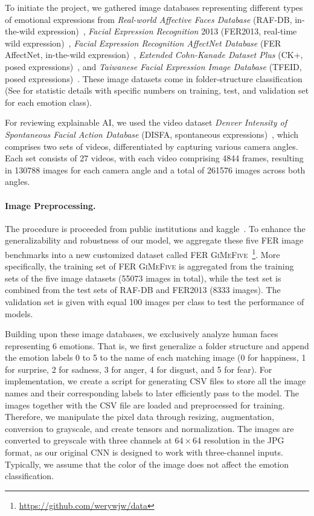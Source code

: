 To initiate the project, 
we gathered image databases representing different types of emotional expressions from 
\textit{Real-world Affective Faces Database} (RAF-DB, in-the-wild expression)~\cite{li_reliable_2017,li2019reliable}, 
\textit{Facial Expression Recognition} 2013 (FER2013, real-time wild expression)~\cite{BarsoumZCZ16}, 
\textit{Facial Expression Recognition AffectNet Database} (FER AffectNet, in-the-wild expression)~\cite{Mollah2019ANet}, 
\textit{Extended Cohn-Kanade Dataset Plus} (CK+, posed expressions)~\cite{LuceyCKSAM10}, 
and \textit{Taiwanese Facial Expression Image Database} (TFEID, posed expressions)~\cite{tfeid,LiGL22}.
These image datasets come in folder-structure classification (See  
for statistic details with specific numbers on training, test, and validation set for each emotion class). 

For reviewing explainable AI, 
we used the video dataset \textit{Denver Intensity of Spontaneous Facial Action Database} 
(DISFA, spontaneous expressions)~\cite{MavadatiMBTC13}, 
which comprises two sets of videos, 
differentiated by capturing various camera angles. 
Each set consists of 27 videos, with each video comprising 4844 frames, 
resulting in 130788 images for each camera angle and a total of 261576 images across both angles. 

\paragraph{Image Preprocessing.}
The procedure is proceeded from public institutions and kaggle~\cite{kaggle_rafdb,kagaff}. 
To enhance the generalizability and robustness of our model, 
we aggregate these five FER image benchmarks into a new customized dataset called FER 
\textsc{GiMeFive}~\footnote{\url{https://github.com/werywjw/data}}. 
More specifically, 
the training set of FER \textsc{GiMeFive} is aggregated from the training sets of the five image datasets (55073 images in total), 
while the test set is combined from the test sets of RAF-DB and FER2013 (8333 images). 
The validation set is given with equal 100 images per class to test the performance of models. 

Building upon these image databases, we exclusively analyze human faces representing 6 emotions. 
That is, we first generalize a folder structure and append the emotion labels 0 to 5 to the name of each matching image 
(0 for happiness, 1 for surprise, 2 for sadness, 3 for anger, 4 for disgust, and 5 for fear).
For implementation, 
we create a script for generating CSV files to store all the image names and their corresponding labels to later efficiently pass to the model. 
The images together with the CSV file are loaded and preprocessed for training. 
Therefore, we manipulate the pixel data through resizing, 
augmentation, conversion to grayscale, and create tensors and normalization. 
The images are converted to greyscale with three channels at $64 \times 64$ resolution in the JPG format, 
as our original CNN is designed to work with three-channel inputs. 
Typically, we assume that the color of the image does not affect the emotion classification. 

